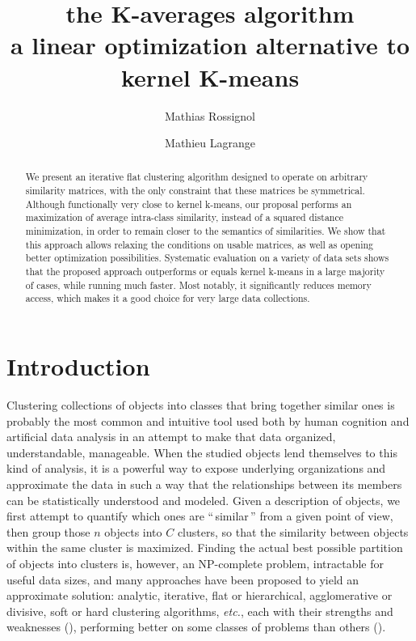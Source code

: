 \documentclass[a4paper,twoside]{article}
\begin{document}
\title{the K-averages algorithm \\ a linear optimization alternative to kernel K-means}

\author{Mathias Rossignol \and Mathieu Lagrange}

\editor{}

\maketitle


\begin{abstract}

We present an iterative flat clustering algorithm designed to operate on arbitrary similarity matrices, with the only constraint that these matrices be symmetrical. Although functionally very close to kernel k-means, our proposal performs an maximization of average intra-class similarity, instead of a squared distance minimization, in order to remain closer to the semantics of similarities. We show that this approach allows relaxing the conditions on usable matrices, as well as opening better optimization possibilities. Systematic evaluation on a variety of data sets shows that the proposed approach outperforms or equals kernel k-means in a large majority of cases, while running much faster. Most notably, it significantly reduces memory access, which makes it a good choice for very large data collections.

\end{abstract}


\section{Introduction}

Clustering collections of objects into classes that bring together similar ones is probably the most common and intuitive tool used both by human cognition and artificial data analysis in an attempt to make that data organized, understandable, manageable. When the studied objects lend themselves to this kind of analysis, it is a powerful way to expose underlying organizations and approximate the data in such a way that the relationships between its members can be statistically understood and modeled. Given a description of objects, we first attempt to quantify which ones are ``\,similar\,'' from a given point of view, then group those $n$ objects into $C$ clusters, so that the similarity between objects within the same cluster is maximized. Finding the actual best possible partition of objects into clusters is, however, an NP-complete problem, intractable for useful data sizes, and many approaches have been proposed to yield an approximate solution: analytic, iterative, flat or hierarchical, agglomerative or divisive, soft or hard clustering algorithms, \textit{etc.}, each with their strengths and weaknesses (\cite{jain2010data}), performing better on some classes of problems than others (\cite{steinbach2000comparison,thalamuthu2006evaluation}).
\end{document}
